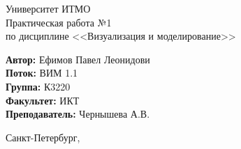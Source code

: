 \documentclass[12pt,a4paper]{article}
\begin{document}
	
\begin{titlepage}
	
\begin{center}
	\large Университет ИТМО\\[5cm]
	\LARGE Практическая работа №1\\
	\normalsize по дисциплине <<Визуализация и моделирование>>\\[5cm]
\end{center}
\begin{flushright}
		\begin{minipage}{0.6\textwidth}
		\begin{flushleft}
			\large
			\singlespacing 
			\textbf{Автор:} Ефимов Павел Леонидови\\
			\textbf{Поток:} ВИМ 1.1\\
			\textbf{Группа:} К3220\\
			\textbf{Факультет:} ИКТ\\
			\textbf{Преподаватель:} Чернышева А.В.
		\end{flushleft}
	\end{minipage}
\end{flushright}

\vfill

\begin{center}
	{\large Санкт-Петербург, \the{}}
\end{center}
 
\end{titlepage}
\normalsize
\end{document}

